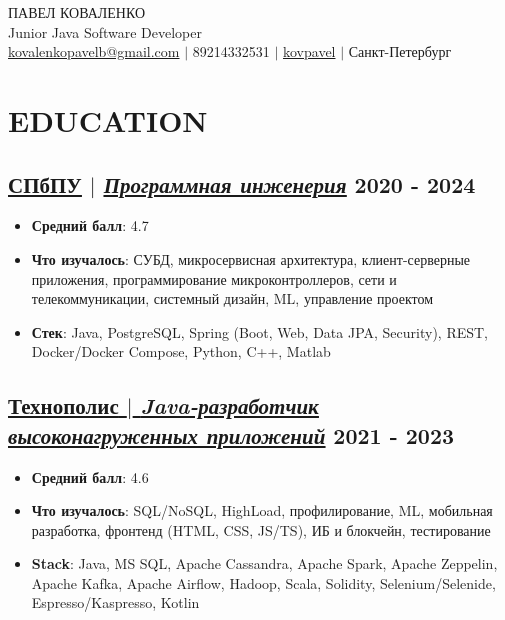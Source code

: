 \documentclass[11pt]{article}
\begin{document}
\begin{center}
    {\fontsize{36}{36}\selectfont ПАВЕЛ КОВАЛЕНКО} \\ \bigskip
    {\fontsize{25}{25}\selectfont Junior Java Software Developer} \\ \bigskip
    {\color{icnclr}\faEnvelope[email]} \href{mailto:paaavel.2024@gmail.com}{kovalenkopavelb@gmail.com} $|$ 
    {\color{icnclr}} 89214332531 $|$
    {\color{icnclr}\faGithub} \href{https://github.com/kovpavel}{kovpavel} $|$
    {\color{icnclr}\faMapMarker} Санкт-Петербург
\end{center}

\section{EDUCATION}
\subsection{\href{https://www.spbstu.ru/}{\underline{СПбПУ}} $|$ {\normalfont\textit{\href{https://www.spbstu.ru/structure/graduate_school_software_engineering/}{\underline{Программная инженерия}}}} \hfill 2020 - 2024}
\begin{itemize}
    \item \textbf{Средний балл}: 4.7
    \item \textbf{Что изучалось}: СУБД, микросервисная архитектура, клиент-серверные приложения, программирование микроконтроллеров, сети и телекоммуникации, системный дизайн, ML, управление проектом
    \item \textbf{Стек}: Java, PostgreSQL, Spring (Boot, Web, Data JPA, Security), REST, Docker/Docker Compose, Python, C++, Matlab
\end{itemize}

\subsection{\href{https://polis.vk.company/}{\underline{Технополис} $|$ {\normalfont\textit{\underline{Java-разработчик высоконагруженных приложений}}}} \hfill 2021 - 2023}
\begin{itemize}
    \item \textbf{Средний балл}: 4.6
    \item \textbf{Что изучалось}: SQL/NoSQL, HighLoad, профилирование, ML, мобильная разработка, фронтенд (HTML, CSS, JS/TS), ИБ и блокчейн, тестирование
    \item \textbf{Stack}: Java, MS SQL, Apache Cassandra, Apache Spark, Apache Zeppelin, Apache Kafka, Apache Airflow, Hadoop, Scala, Solidity, Selenium/Selenide, Espresso/Kaspresso, Kotlin
\end{itemize}
\end{document}
